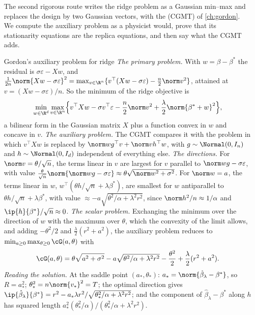 \begin{refsection}
The second rigorous route writes the ridge problem as a Gaussian min--max and replaces the design by two Gaussian vectors, with the  (CGMT) of \cref{ch:gordon}. We compute the auxiliary problem as a physicist would, prove that its stationarity equations are the replica equations, and then say what the CGMT adds.

\begin{computation}{Gordon's auxiliary problem for ridge}\label{comp:ridge:ao}
\step \emph{The primary problem.} With $w=\beta-\beta^*$ the residual is $\sigma\varepsilon-Xw$, and $\frac1{2n}\norm{Xw-\sigma\varepsilon}^2=\max_{v\in\R^n}\{v^\top(Xw-\sigma\varepsilon)-\frac n2\norm v^2\}$, attained at $v=(Xw-\sigma\varepsilon)/n$. So the minimum of the ridge objective is
\[
\min_{w\in\R^d}\max_{v\in\R^n}\Bigl\{v^\top Xw-\sigma v^\top\varepsilon-\frac n2\norm v^2+\frac\lambda2\norm{\beta^*+w}^2\Bigr\},
\]
a bilinear form in the Gaussian matrix $X$ plus a function convex in $w$ and concave in $v$.
\step \emph{The auxiliary problem.} The CGMT compares it with the problem in which $v^\top Xw$ is replaced by $\norm wg^\top v+\norm vh^\top w$, with $g\sim\Normal(0,I_n)$ and $h\sim\Normal(0,I_d)$ independent of everything else.
\step \emph{The directions.} For $\norm v=\theta/\sqrt n$, the terms linear in $v$ are largest for $v$ parallel to $\norm wg-\sigma\varepsilon$, with value $\frac\theta{\sqrt n}\norm{\norm wg-\sigma\varepsilon}\approx\theta\sqrt{\norm w^2+\sigma^2}$. For $\norm w=a$, the terms linear in $w$, $w^\top(\theta h/\sqrt n+\lambda\beta^*)$, are smallest for $w$ antiparallel to $\theta h/\sqrt n+\lambda\beta^*$, with value $\approx-a\sqrt{\theta^2/\alpha+\lambda^2r^2}$, since $\norm h^2/n\approx1/\alpha$ and $\ip{h}{\beta^*}/\sqrt n\approx0$.
\step \emph{The scalar problem.} Exchanging the minimum over the direction of $w$ with the maximum over $\theta$, which the convexity of the limit allows, and adding $-\theta^2/2$ and $\frac\lambda2(r^2+a^2)$, the auxiliary problem reduces to $\min_{a\ge0}\max_{\theta\ge0}\cG(a,\theta)$ with
\begin{equation}\label{eq:ridge:ao}
\cG(a,\theta)=\theta\sqrt{a^2+\sigma^2}-a\sqrt{\theta^2/\alpha+\lambda^2r^2}-\frac{\theta^2}2+\frac\lambda2(r^2+a^2).
\end{equation}
\step \emph{Reading the solution.} At the saddle point $(a_*,\theta_*)$: $a_*=\norm{\hat\beta_\lambda-\beta^*}$, so $R=a_*^2$; $\theta_*^2=n\norm{v_*}^2=T$; the optimal direction gives $\ip{\hat\beta_\lambda}{\beta^*}=r^2-a_*\lambda r^2/\sqrt{\theta_*^2/\alpha+\lambda^2r^2}$; and the component of $\hat\beta_\lambda-\beta^*$ along $h$ has squared length $a_*^2(\theta_*^2/\alpha)/(\theta_*^2/\alpha+\lambda^2r^2)$.
\end{computation}


\end{refsection}
